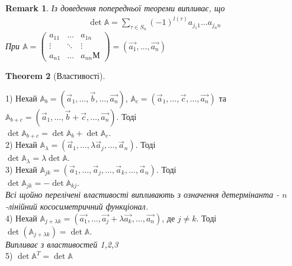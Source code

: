 \documentclass[a4paper, 10pt]{article}
\def\huge{\displaystyle}
\theoremstyle{theoremdd}
\newtheorem{theorem}{Theorem}[subsection]
\theoremstyle{theoremdd}
\theoremstyle{theoremdd}
\theoremstyle{theoremdd}
\theoremstyle{theoremdd}
\theoremstyle{theoremdd}
\newtheorem{remark}[theorem]{Remark}
\theoremstyle{theoremdd}
\theoremstyle{theoremdd}
\begin{document}
\begin{remark}
Із доведення попередньої теореми випливає, що
\begin{align*}
\det \mathbb{A} = \huge \sum_{\tau \in S_n} (-1)^{l(\tau)} a_{j_1 1}\dots a_{j_n n}
\end{align*}
При $\mathbb{A} = \begin{pmatrix}
 a_{11} & \dots & a_{1n} \\
 \vdots & \ddots &\vdots \\
 a_{n1} & \dots & a_{nn}М
\end{pmatrix} = (\vec{a_1}, \dots, \vec{a_n})$
\end{remark}

\begin{theorem}[Властивості]

\end{theorem}
1) Нехай $\mathbb{A}_b = (\vec{a}_1, \dots, \vec{b}, \dots, \vec{a_n})$, $\mathbb{A}_c = (\vec{a}_1, \dots, \vec{c}, \dots, \vec{a_n})$ та $\mathbb{A}_{b+c} = (\vec{a}_1, \dots, \vec{b}+\vec{c}, \dots, \vec{a_n})$. Тоді\\
$\det \mathbb{A}_{b+c} = \det \mathbb{A}_b + \det \mathbb{A}_{c}$.
\bigskip \\
2) Нехай $\mathbb{A}_{\lambda} = (\vec{a}_1, \dots, \lambda \vec{a}_j, \dots, \vec{a}_n)$. Тоді\\
$\det \mathbb{A}_{\lambda} = \lambda \det \mathbb{A}$.
\bigskip \\
3) Нехай $\mathbb{A}_{jk} = (\vec{a}_1, \dots, \vec{a}_j, \dots, \vec{a}_k, \dots, \vec{a}_n)$. Тоді \\
$\det \mathbb{A}_{jk} = - \det \mathbb{A}_{kj}$.\\
\textit{Всі щойно перелічені властивості випливають з означення детермінанта - $n$-лінійний кососиметричний функціонал.}
\bigskip \\
4) Нехай $\mathbb{A}_{j + \lambda k} = (\vec{a_1},\dots, \vec{a_j} + \lambda \vec{a_k}, \dots, \vec{a_n})$, де $j \neq k$. Тоді\\
$\det (\mathbb{A}_{j + \lambda k}) = \det \mathbb{A}$.\\
\textit{Випливає з властивостей 1,2,3}
\bigskip \\
5) $\det \mathbb{A}^T = \det \mathbb{A}$
\end{document}

